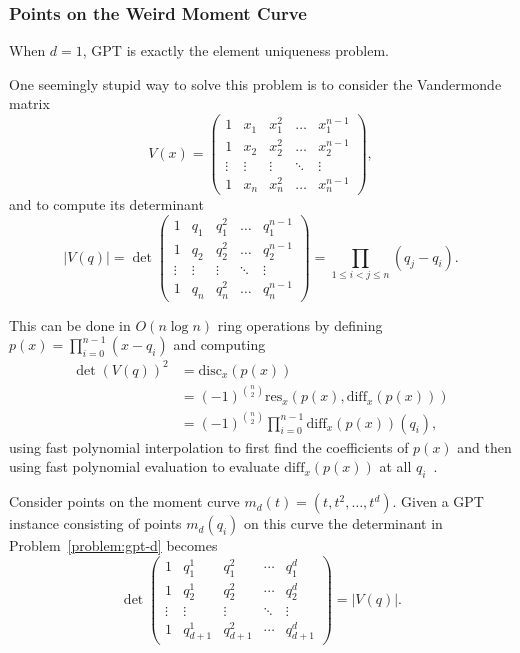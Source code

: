 \subsubsection{Points on the Weird Moment Curve}

When \(d=1\), GPT is exactly the element uniqueness problem.
%


One seemingly stupid way to solve this problem is to
consider the Vandermonde matrix
%
\begin{displaymath}
V(x) = \begin{pmatrix}
    1       & x_1     & x_1^2     & \dots  & x_1^{n-1}     \\
    1       & x_2     & x_2^2     & \dots  & x_2^{n-1}     \\
    \vdots  & \vdots  & \vdots    & \ddots & \vdots        \\
    1       & x_n & x_n^2 & \dots  & x_n^{n-1}
\end{pmatrix},
\end{displaymath}
%
and to compute its determinant
%
\begin{displaymath}
|V(q)| = \det\begin{pmatrix}
    1       & q_1     & q_1^2     & \dots  & q_1^{n-1}     \\
    1       & q_2     & q_2^2     & \dots  & q_2^{n-1}     \\
    \vdots  & \vdots  & \vdots    & \ddots & \vdots        \\
    1       & q_n & q_n^2 & \dots  & q_n^{n-1}
\end{pmatrix}
=
\prod_{1 \leq i < j \leq n} (q_j - q_i).
\end{displaymath}

This can be done in \(O(n \log n)\) ring operations by defining
%
\(p(x) = \prod_{i=0}^{n-1} (x-q_i)\)
%
and computing
%
\begin{align*}
{\det(V(q))}^2 &= \mathrm{disc}_x(p(x)) \\
&= {(-1)}^{\binom{n}{2}} \mathrm{res}_x(p(x), \mathrm{diff}_x(p(x))) \\
&= {(-1)}^{\binom{n}{2}} \prod_{i=0}^{n-1} \mathrm{diff}_x(p(x))(q_i),
\end{align*}
%
using fast polynomial interpolation to first find the coefficients of
\(p(x)\) and then using fast polynomial evaluation to evaluate
\(\mathrm{diff}_x(p(x))\) at all \(q_i\)~\cite{St73,Ku73a,Ku73b,ASU75}.

Consider points on the moment curve $m_d(t) = (t, t^2, \ldots, t^d)$. Given a
GPT instance consisting of points $m_d(q_i)$ on this curve the determinant
in Problem~\ref{problem:gpt-d} becomes
%
\begin{displaymath}
\det\begin{pmatrix}
1      & q_1^1 & q_1^2 & \cdots & q_1^d \\
1      & q_2^1 & q_2^2 & \cdots & q_2^d \\
\vdots & \vdots  & \vdots  & \ddots & \vdots  \\
1      & q_{d+1}^1 & q_{d+1}^2 & \cdots & q_{d+1}^d
\end{pmatrix}
=
|V(q)|.
\end{displaymath}

